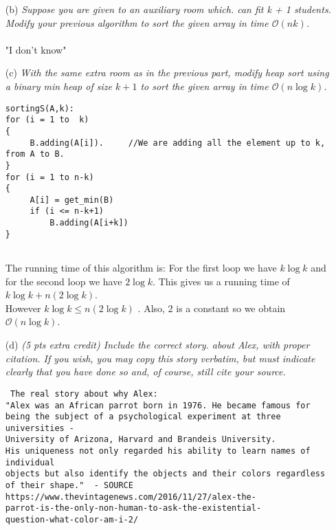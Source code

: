 \documentclass[11pt]{article} \setlength{\oddsidemargin}{0in}
\begin{document}
{\begin{enumerate}
    \begin{verbatim}
sorting_nKlogK(A,k):
for (i = 0 to length(A) - k)
{
     sort(A, i , i+k-1)
}
      
\end{verbatim}
    The algorithm will run in  $\mathcal{O}(n k \log k)$ because we have the $for loop$ that is $n$. And then we have the $sort$ function which is ($k \log k$). Therefore we get  $\mathcal{O}(n k \log k)$.\\
  
    
  \item[(b)]{\textit{Suppose you are given to an auxiliary room which.   %
        can fit k + 1 students. Modify your previous algorithm to sort
        the given array in time $\mathcal{O}(nk)$.}}
    \\\\
    "I don't know"
    \\
    \newpage
  \item[(c)]{\textit{With the same extra room as in the previous part,    %
        modify heap sort using a binary min heap of size $k + 1$ to sort
        the given array in time $\mathcal{O}(n \log k)$.}}
    
     \begin{verbatim}
sortingS(A,k):
for (i = 1 to  k)
{
     B.adding(A[i]).     //We are adding all the element up to k, from A to B.     
}
for (i = 1 to n-k)
{
     A[i] = get_min(B)
     if (i <= n-k+1)
         B.adding(A[i+k])
}
      
\end{verbatim}
  The running time of this algorithm is:
  For the first loop we have $k \log k$ and for the second loop we have $2 \log k$. This gives us a running time of $k \log k + n(2 \log k)$. \\
  However $k \log k \leq n(2 \log k)$ . Also, 2 is a constant so we obtain $\mathcal{O} (n \log k)$. 
  
  \item[(d)]{\textit{(5 pts extra credit) Include the correct story.   %
        about Alex, with proper citation. If you wish, you may copy this
        story verbatim, but must indicate clearly that you have done so
        and, of course, still cite your source.}}
     \begin{verbatim}
 The real story about why Alex:
"Alex was an African parrot born in 1976. He became famous for 
being the subject of a psychological experiment at three universities -
University of Arizona, Harvard and Brandeis University.
His uniqueness not only regarded his ability to learn names of individual 
objects but also identify the objects and their colors regardless
of their shape."  - SOURCE 
https://www.thevintagenews.com/2016/11/27/alex-the-
parrot-is-the-only-non-human-to-ask-the-existential-
question-what-color-am-i-2/ 


\end{verbatim}
\end{enumerate}}
\end{document}
